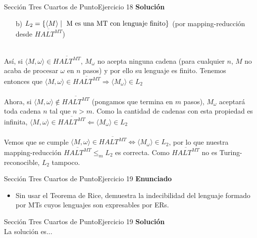 \documentclass[10pt, envcountsect, presentation, aspectratio=169]{beamer}
\begin{document}

\begin{frame}{Sección Tres Cuartos de Punto}{Ejercicio 18}
    \textbf{Solución}\\
    \begin{itemize}
        \item[b)] $L_2=\{\langle M \rangle \mid \hbox{ M es una MT con lenguaje finito}  \}$ (por mapping-reducción desde $\overline{HALT^{MT}}$) \\~\\
    \end{itemize}
    Así, si $\langle M, \omega \rangle \in \overline{HALT^{MT}}$, $M_{\omega}$ no acepta ninguna cadena (para cualquier $n$, $M$ no acaba de procesar $\omega$ en $n$ pasos) y por ello su lenguaje es finito. Tenemos entonces que $\langle M, \omega \rangle \in \overline{HALT^{MT}} \Rightarrow \langle M_{\omega} \rangle \in L_2$\\~\\
    Ahora, si $\langle M, \omega \rangle \notin \overline{HALT^{MT}}$ (pongamos que termina en $m$ pasos), $M_\omega$ aceptará toda cadena $n$ tal que $n>m$. Como la cantidad de cadenas con esta propiedad es infinita, $\langle M, \omega \rangle \in \overline{HALT^{MT}} \Leftarrow \langle M_{\omega} \rangle \in L_2$\\~\\
    Vemos que se cumple $\langle M, \omega \rangle \in \overline{HALT^{MT}} \Leftrightarrow \langle M_{\omega} \rangle \in L_2$, por lo que nuestra  mapping-reducción $\overline{HALT^{MT}}\le_m L_2$ es correcta. Como $\overline{HALT^{MT}}$ no es Turing-reconocible, $L_2$ tampoco.  
\end{frame}


\begin{frame}{Sección Tres Cuartos de Punto}{Ejercicio 19}
    \textbf{Enunciado}
    \begin{itemize}
        \item Sin usar el Teorema de Rice, demuestra la indecibilidad del lenguaje formado por MTs cuyos lenguajes son expresables por ERs.
    \end{itemize}
\end{frame}


\begin{frame}{Sección Tres Cuartos de Punto}{Ejercicio 19}
    \textbf{Solución}\\
    La solución es...
\end{frame}
\end{document}
